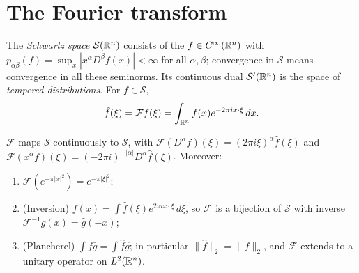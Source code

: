 \section{The Fourier transform}\label{distributions:section-fourier}

\begin{definition}\label{distributions:definition-schwartz}
The \emph{Schwartz space} $\mathcal{S}(\mathbb{R}^n)$ consists of the $f \in C^\infty(\mathbb{R}^n)$ with $p_{\alpha\beta}(f) = \sup_x|x^\alpha D^\beta f(x)| < \infty$ for all $\alpha, \beta$; convergence in $\mathcal{S}$ means
convergence in all these seminorms. Its continuous dual $\mathcal{S}'(\mathbb{R}^n)$ is the space of \emph{tempered distributions}. For $f \in \mathcal{S}$,
\[
\hat f(\xi) = \mathcal{F}f(\xi) = \int_{\mathbb{R}^n}f(x)e^{-2\pi i x \cdot \xi}\,dx .
\]
\end{definition}

\begin{theorem}\label{distributions:theorem-fourier-schwartz}
$\mathcal{F}$ maps $\mathcal{S}$ continuously to $\mathcal{S}$, with $\mathcal{F}(D^\alpha f)(\xi) = (2\pi i\xi)^\alpha\hat f(\xi)$ and $\mathcal{F}(x^\alpha f)(\xi) = (-2\pi i)^{-|\alpha|}D^\alpha\hat f(\xi)$.
Moreover:
\begin{enumerate}
\item $\mathcal{F}(e^{-\pi|x|^2}) = e^{-\pi|\xi|^2}$;
\item (Inversion) $f(x) = \int\hat f(\xi)e^{2\pi ix\cdot\xi}\,d\xi$, so $\mathcal{F}$ is a bijection of $\mathcal{S}$ with inverse $\mathcal{F}^{-1}g(x) = \hat g(-x)$;
\item (Plancherel) $\int f\bar g = \int\hat f\overline{\hat g}$; in particular $\|\hat f\|_2 = \|f\|_2$, and $\mathcal{F}$ extends to a unitary operator on $L^2(\mathbb{R}^n)$.
\end{enumerate}
\end{theorem}


